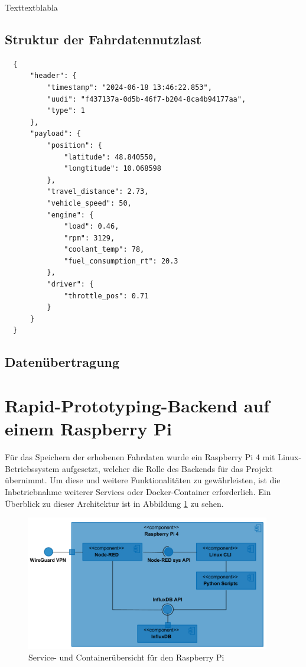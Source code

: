 \documentclass[oneside]{ausarbeitung}
\begin{document}
Texttextblabla

\subsection*{Struktur der Fahrdatennutzlast}

\begin{verbatim}
  {
      "header": {
          "timestamp": "2024-06-18 13:46:22.853",
          "uudi": "f437137a-0d5b-46f7-b204-8ca4b94177aa",
          "type": 1
      },
      "payload": {
          "position": {
              "latitude": 48.840550,
              "longtitude": 10.068598
          },
          "travel_distance": 2.73,
          "vehicle_speed": 50,
          "engine": {
              "load": 0.46,
              "rpm": 3129,
              "coolant_temp": 78,
              "fuel_consumption_rt": 20.3
          },
          "driver": {
              "throttle_pos": 0.71
          }
      }
  }
  \end{verbatim}

\subsection*{Datenübertragung}

\section{Rapid-Prototyping-Backend auf einem Raspberry Pi}
\label{sec:implement_backend}

Für das Speichern der erhobenen Fahrdaten wurde ein Raspberry Pi 4 mit Linux-Betriebssystem aufgesetzt,
welcher die Rolle des Backends für das Projekt übernimmt. Um diese und weitere Funktionalitäten zu gewährleisten,
ist die Inbetriebnahme weiterer Services oder Docker-Container erforderlich. Ein Überblick zu dieser Architektur
ist in Abbildung \ref{fig:overview_backend} zu sehen.

\begin{figure}[h!]
  \centering
  \includegraphics[width=0.95\textwidth]{images/comp_dia_raspi.PNG}
  \caption{Service- und Containerübersicht für den Raspberry Pi}
  \label{fig:overview_backend}
\end{figure}
\end{document}
